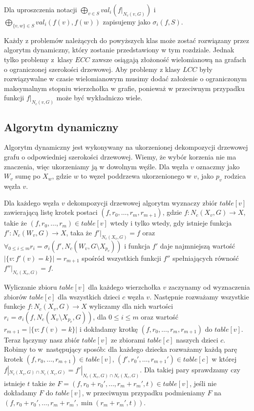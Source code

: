\documentclass[twoside,a4paper,12pt]{report} %
\theoremstyle{break}
\begin{document}
Dla uproszczenia notacji $\bigoplus_{v \in S} val_i(f|_{N_c(v,G)})$ i $\bigoplus_{\{v,w\}\in S} val_i(f(v), f(w))$ zapisujemy jako $\sigma_i (f, S)$.

Każdy z problemów należących do powyższych klas może zostać rozwiązany przez algorytm dynamiczny, który zostanie przedstawiony w tym rozdziale. Jednak tylko problemy z~klasy $ECC$ zawsze osiągają złożoność wielomianową na grafach o ograniczonej szerokości drzewowej. Aby problemy z klasy $LCC$ były rozwiązywalne w czasie wielomianowym musimy dodać założenie o ograniczonym maksymalnym stopniu wierzchołka w grafie, ponieważ w przeciwnym przypadku funkcji $f|_{N_c(v,G)}$ może być wykładniczo wiele.

\subsection{Algorytm dynamiczny}
Algorytm dynamiczny jest wykonywany na ukorzenionej dekompozycji drzewowej grafu o odpowiedniej szerokości drzewowej. Wiemy, że wybór korzenia nie ma znaczenia, więc ukorzeniamy ją w dowolnym węźle. Dla węzła $v$ oznaczmy jako $W_v$ sumę po $X_w$, gdzie $w$ to węzeł poddrzewa ukorzenionego w $v$, jako $p_v$ rodzica węzła $v$. 

Dla każdego węzła $v$ dekompozycji drzewowej algorytm wyznaczy zbiór $table[v]$ zawierającą listę krotek postaci $(f,r_0,\dots,r_m,r_{m+1})$, gdzie $f\colon N_c(X_v,G) \rightarrow X$, takie że $(f,r_0,\dots,r_m) \in table[v]$ wtedy i tylko wtedy, gdy istnieje funkcja $f'\colon N_c(W_v,G) \rightarrow X$, taka że $f'|_{N_c(X_v,G)}=f$ oraz $\forall_{0 \le i \le m} r_i = \sigma_i(f', N_c(W_v,G \setminus X_{p_v}))$ i funkcja $f'$ daje najmniejszą wartość $|\{v \colon f'(v)=k\}| = r_{m+1}$ spośród wszystkich funkcji $f''$ spełniających równość $f''|_{N_c(X_v,G)}=f$.

Wyliczanie zbioru $table[v]$ dla każdego wierzchołka $v$ zaczynamy od wyznaczenia zbiorów $table[c]$ dla wszystkich dzieci $c$ węzła $v$. Następnie rozważamy wszystkie funkcje $f:N_c(X_v,G) \rightarrow X$ wyliczamy dla nich wartości $r_i = \sigma_i(f,N_c(X_v \setminus X_{p_v},G))$, dla $0\le i \le m$ oraz wartość $r_{m+1}=|\{v\colon f(v)=k\}|$ i dokładamy krotkę $(f,r_0,\dots,r_m,r_{m+1})$ do $table[v]$. Teraz łączymy nasz zbiór $table[v]$ ze zbiorami $table[c]$ naszych dzieci $c$. Robimy to w~następujący sposób: dla każdego dziecka rozważamy każdą parę krotek $(f,r_0,\dots,r_{m+1}) \in table[v]$, $(f',r_0',\dots,r_{m+1}') \in table[c]$ w której $f|_{N_c(X_v,G)\cap N_c(X_c,G)} = f'|_{N_c(X_v,G)\cap N_c(X_c,G)}$. Dla takiej pary sprawdzamy czy istnieje $t$ takie że $F = (f,r_0 + r_0',\dots,r_m + r_m',t) \in table[v]$, jeśli nie dokładamy $F$ do $table[v]$, w przeciwnym przypadku podmieniamy $F$ na $(f,r_0 + r_0',\dots,r_m + r_m',\min (r_m+r_m',t))$.
\end{document}
